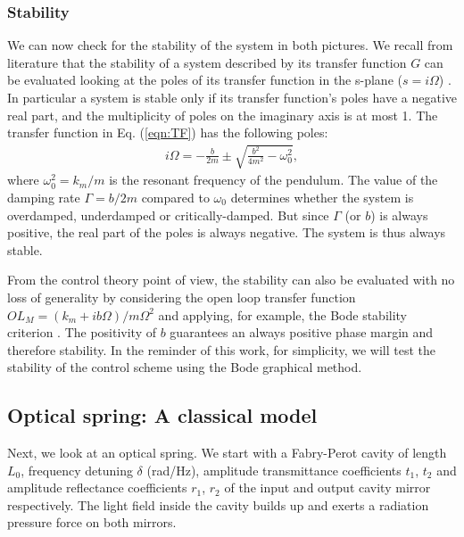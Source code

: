 
\subsubsection{Stability}
We can now check for the stability of the system in both pictures.
We recall from literature that the stability of a system described by its transfer function $G$ can be evaluated looking at the poles 
of its transfer function in the s-plane ($s=i\Omega$) \cite{Greensite70}. In particular a system is stable only if its transfer function's poles have
a negative real part,  and the multiplicity of poles on the imaginary axis is at most 1.
The transfer function in Eq. (\ref{eqn:TF}) has the following poles:
\begin{align}
\label{eqn:poles}
i\Omega=-\frac{b}{2m}\pm\sqrt{\frac{b^2}{4m^2}-\omega_0^2},
\end{align}
where $\omega_0^2=k_m/m$ is the resonant frequency of the pendulum. 
The value of the damping rate $\Gamma=b/2m$ compared to $\omega_0$ determines whether the system is overdamped, underdamped or critically-damped. But since  $\Gamma$ (or $b$) is always positive, 
the real part of the poles is always negative. The system is thus always stable. 

From the control theory point of view, the stability can also be evaluated with no loss of generality by considering the open loop transfer function $OL_M= (k_m+ib\Omega)/m\Omega^2$ and applying, for example, the Bode stability criterion \cite{Franklin94}. The positivity of $b$ guarantees an always positive phase margin and therefore stability.
In the reminder of this work, for simplicity, we will test the stability of the control scheme using the Bode graphical method.


\subsection{Optical spring: A classical model}
Next, we look at an optical spring.
We start with a Fabry-Perot  cavity of length 
$L_0$, frequency detuning $\delta$ (rad/Hz), amplitude transmittance coefficients $t_1$, $t_2$  and amplitude reflectance coefficients $r_1$, $r_2$ of the input and output cavity mirror respectively. 
The light field inside the cavity builds up and exerts a radiation pressure force on both mirrors.


